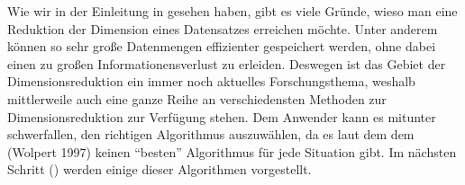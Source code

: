 Wie wir in der Einleitung in  gesehen haben, gibt es viele Gründe, wieso man
eine Reduktion der Dimension eines Datensatzes erreichen möchte. Unter anderem können so sehr große
Datenmengen effizienter gespeichert werden, ohne dabei einen zu großen Informationensverlust zu
erleiden. Deswegen ist das Gebiet der Dimensionsreduktion ein immer noch aktuelles Forschungsthema,
weshalb mittlerweile auch eine ganze Reihe an verschiedensten Methoden zur Dimensionsreduktion zur
Verfügung stehen. Dem Anwender kann es mitunter schwerfallen, den richtigen Algorithmus
auszuwählen, da es laut dem dem \addref (Wolpert 1997) keinen
\enquote{besten} Algorithmus für jede Situation gibt. Im nächsten Schritt
() werden einige dieser Algorithmen vorgestellt.

